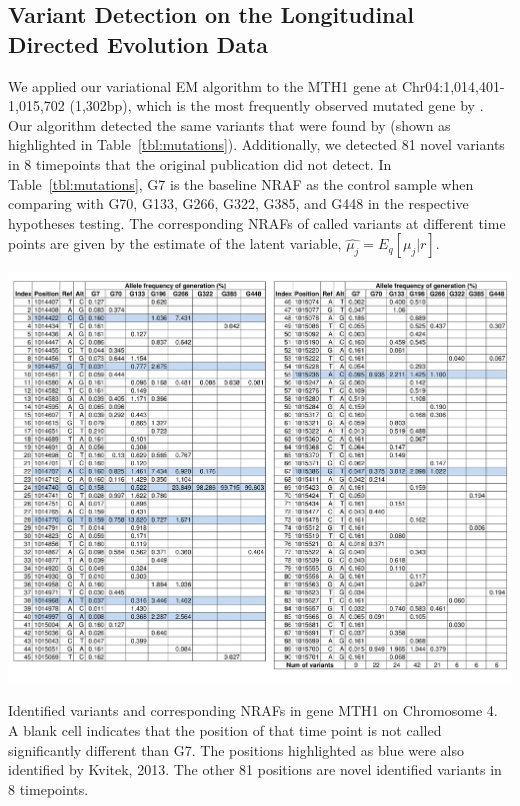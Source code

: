 \documentclass[11pt,reqno]{amsart}
\begin{document}
\subsection{Variant Detection on the Longitudinal Directed Evolution Data}
We applied our variational EM algorithm to the MTH1 gene at Chr04:1,014,401-1,015,702 (1,302bp), which is the most frequently observed mutated gene by \citet{kvitek2013whole}.
Our algorithm detected the same variants that were found by \citet{kvitek2013whole} (shown as highlighted in Table~\ref{tbl:mutations}).
Additionally, we detected 81 novel variants in 8 timepoints that the original publication did not detect.
In Table~\ref{tbl:mutations}, G7 is the baseline NRAF as the control sample when comparing with G70, G133, G266, G322, G385, and G448 in the respective hypotheses testing.
The corresponding NRAFs of called variants at different time points are given by the estimate of the latent variable, $\hat{\mu_j} = E_q[\mu_j|r]$.
\begin{table}[htbp]
\centering
\includegraphics[width=1.0\textwidth]{tables/mutations_MTH1.png}
\caption{Identified variants and corresponding NRAFs in gene MTH1 on Chromosome 4.
A blank cell indicates that the position of that time point is not called significantly different than G7.
The positions highlighted as blue were also identified by Kvitek, 2013.
The other 81 positions are novel identified variants in 8 timepoints.}
\label{tbl:mutations}
\end{table}
\end{document}
